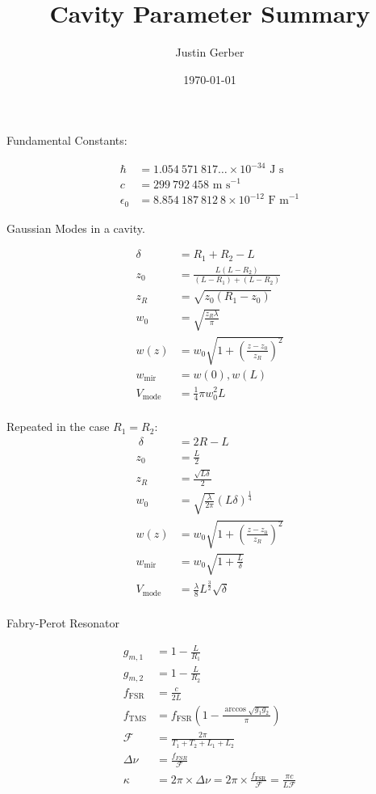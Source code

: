 \documentclass[12pt]{article}
\begin{document}
\title{Cavity Parameter Summary}
\author{Justin Gerber}
\date{\today}
\maketitle

Fundamental Constants:

\begin{align}
\hbar &= 1.054~571~817\ldots \times 10^{-34} \text{ J s}\\
c &= 299~792~458 \text{ m s}^{-1}\\
\epsilon_0 &= 8.854~187~812~8 \times 10^{-12} \text{ F m}^{-1}
\end{align}

Gaussian Modes in a cavity.

\begin{align}
\delta &= R_1 + R_2 - L\\
z_0 &= \frac{L(L-R_2)}{(L-R_1) + (L-R_2)}\\
z_R &= \sqrt{z_0(R_1-z_0)}\\
w_0 &= \sqrt{\frac{z_R \lambda}{\pi}}\\
w(z) &= w_0\sqrt{1+\left(\frac{z-z_0}{z_R}\right)^2}\\
w_{\text{mir}} &= w(0), w(L)\\
V_{\text{mode}} &= \frac{1}{4} \pi w_0^2 L\\
\end{align}

Repeated in the case $R_1 = R_2$:
\begin{align}\
\delta &= 2R - L\\
z_0 &= \frac{L}{2}\\
z_R &= \frac{\sqrt{L\delta}}{2}\\
w_0 &= \sqrt{\frac{\lambda}{2\pi}}(L\delta)^{\frac{1}{4}}\\
w(z) &= w_0\sqrt{1+\left(\frac{z-z_0}{z_R}\right)^2}\\
w_{\text{mir}} &= w_0\sqrt{1+\frac{L}{\delta}}\\
V_{\text{mode}} &= \frac{\lambda}{8} L^{\frac{3}{2}}\sqrt{\delta}\\
\end{align}


Fabry-Perot Resonator

\begin{align}
g_{m,1} &= 1 - \frac{L}{R_1}\\
g_{m,2} &= 1 - \frac{L}{R_2}\\
f_{\text{FSR}} &= \frac{c}{2L}\\
f_{\text{TMS}} &= f_{\text{FSR}} \left(1-\frac{\arccos{\sqrt{g_1g_2}}}{\pi}\right)\\
\mathcal{F} &= \frac{2\pi}{T_1 + T_2 + L_1 + L_2}\\
\Delta \nu &= \frac{f_{FSR}}{\mathcal{F}}\\
\kappa &= 2\pi \times \Delta \nu = 2\pi \times \frac{f_{\text{FSR}}}{\mathcal{F}} = \frac{\pi c}{L\mathcal{F}}
\end{align} 
\end{document}
